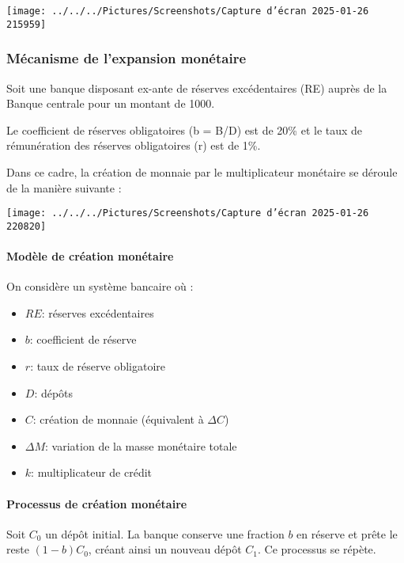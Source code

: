 \documentclass[a4paper, 12pt]{report}
\begin{document}
\begin{center}
	\texttt{[image: ../../../Pictures/Screenshots/Capture d'écran 2025-01-26 215959]}
\end{center}
	
\subsubsection{Mécanisme de l'expansion monétaire}
	
Soit une banque disposant ex-ante de réserves excédentaires (RE) auprès de la Banque centrale pour un montant de 1000.

Le coefficient de réserves obligatoires (b = B/D) est de 20\% et le taux de rémunération des réserves obligatoires (r) est de 1\%.

Dans ce cadre, la création de monnaie par le multiplicateur monétaire se déroule de la manière suivante :
\begin{center}
	
\texttt{[image: ../../../Pictures/Screenshots/Capture d'écran 2025-01-26 220820]}
	
\end{center}
	
\paragraph{Modèle de création monétaire}

On considère un système bancaire où :
\begin{itemize}
	\item $RE$: réserves excédentaires
	\item $b$: coefficient de réserve
	\item $r$: taux de réserve obligatoire
	\item $D$: dépôts
	\item $C$: création de monnaie (équivalent à $\Delta C$)
	\item $\Delta M$: variation de la masse monétaire totale
	\item $k$: multiplicateur de crédit
\end{itemize}

\paragraph{Processus de création monétaire}

Soit $C_0$ un dépôt initial. La banque conserve une fraction $b$ en réserve et prête le reste $(1-b)C_0$, créant ainsi un nouveau dépôt $C_1$. Ce processus se répète.
\end{document}
